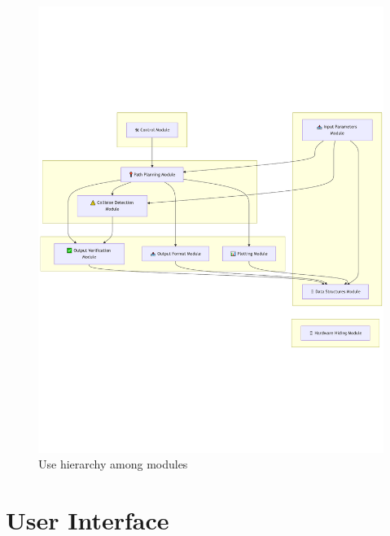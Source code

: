 \documentclass[12pt, titlepage]{article}
\begin{document}
\begin{figure}[H]
\centering
\includegraphics[width=1\textwidth]{figure2.pdf}
\caption{Use hierarchy among modules}
\label{FigUH}
\end{figure}




\section{User Interface} \label{SecUI}
\end{document}
